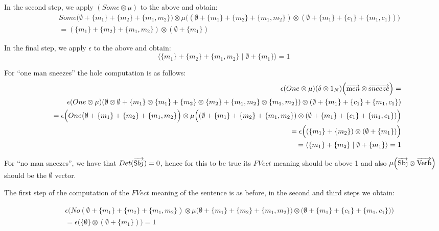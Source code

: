 \noindent
In the second step, we apply $(Some \otimes \mu)$ to the above and obtain:
\begin{eqnarray*}
&& Some\Big(\emptyset + \{m_1\} + \{m_2\} + \{m_1, m_2\}\Big) \otimes \mu \Big((\emptyset  + \{m_1\}  + \{m_2\}  + \{m_1, m_2\}) \otimes (\emptyset + \{m_1\} + \{c_1\} + \{m_1, c_1\})\Big) \\
&&= (\{m_1\} + \{m_2\} + \{m_1, m_2\}) \otimes (\emptyset + \{m_1\})
\end{eqnarray*}

\noindent
In the final step, we apply $\epsilon$ to the above and obtain:
\[
\langle \{m_1\} + \{m_2\} + \{m_1, m_2\} \mid \emptyset + \{m_1\} \rangle =  1
\]

\noindent
For ``one man sneezes'' the hole computation is as follows:
\begin{eqnarray*}
&&\epsilon(One \otimes \mu)(\delta \otimes 1_N) \Big(\overrightarrow{\text men} \otimes \overrightarrow{\text sneeze}\Big) = \\
&&  \epsilon(One \otimes \mu)(\emptyset \otimes \emptyset + \{m_1\} \otimes \{m_1\} + \{m_2\} \otimes \{m_2\} + \{m_1, m_2\} \otimes \{m_1, m_2\}) \otimes (\emptyset + \{m_1\} + \{c_1\} + \{m_1, c_1\})\\
&&= \epsilon \Big (One\big(\emptyset + \{m_1\} + \{m_2\} + \{m_1, m_2\}\Big) \otimes \mu \Big((\emptyset  + \{m_1\}  + \{m_2\}  + \{m_1, m_2\}) \otimes (\emptyset + \{m_1\} + \{c_1\} + \{m_1, c_1\})\Big) \\
&&= \epsilon \Big((\{m_1\} + \{m_2\} ) \otimes (\emptyset + \{m_1\})\Big)\\
&&= \langle \{m_1\} + \{m_2\}  \mid \emptyset + \{m_1\} \rangle =  1
\end{eqnarray*}


\noindent
For ``no man sneezes'', we have that $Det(\overrightarrow{\text Sbj}) = 0$, hence for this to be true its $FVect$ meaning should be above 1 and also $\mu \Big(\overrightarrow{\text{Sbj}} \otimes \overrightarrow{\text{Verb}} \Big)$ should be the $\emptyset$ vector. 

The first step of the computation  of the $FVect$ meaning of the sentence is as before, in the second and third steps we obtain:

\begin{eqnarray*}
&&\epsilon \Big (No (\emptyset + \{m_1\} + \{m_2\} + \{m_1, m_2\}) \otimes  \mu\big(\emptyset  + \{m_1\}  + \{m_2\}  + \{m_1, m_2\}) \otimes (\emptyset + \{m_1\} + \{c_1\} + \{m_1, c_1\}\big)\Big)\\
&&= 
\epsilon \Big(\{\emptyset\} \otimes (\emptyset + \{m_1\}) \Big) = 1
\end{eqnarray*}

